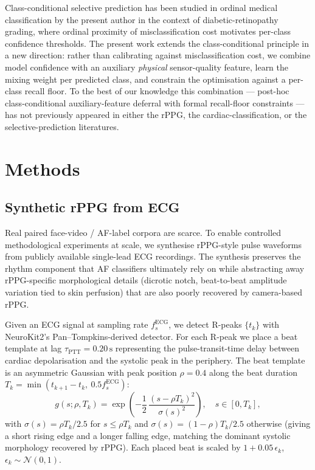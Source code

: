 \documentclass[journal]{IEEEtran}
\begin{document}
Class-conditional selective prediction has been studied in ordinal medical classification by the present author in the context of diabetic-retinopathy grading, where ordinal proximity of misclassification cost motivates per-class confidence thresholds. The present work extends the class-conditional principle in a new direction: rather than calibrating against misclassification cost, we combine model confidence with an auxiliary \emph{physical} sensor-quality feature, learn the mixing weight per predicted class, and constrain the optimisation against a per-class recall floor. To the best of our knowledge this combination --- post-hoc class-conditional auxiliary-feature deferral with formal recall-floor constraints --- has not previously appeared in either the rPPG, the cardiac-classification, or the selective-prediction literatures.

\section{Methods}
\subsection{Synthetic rPPG from ECG}
Real paired face-video / AF-label corpora are scarce. To enable controlled methodological experiments at scale, we synthesise rPPG-style pulse waveforms from publicly available single-lead ECG recordings. The synthesis preserves the rhythm component that AF classifiers ultimately rely on while abstracting away rPPG-specific morphological details (dicrotic notch, beat-to-beat amplitude variation tied to skin perfusion) that are also poorly recovered by camera-based rPPG.

Given an ECG signal at sampling rate $f_s^{\text{ECG}}$, we detect R-peaks $\{t_k\}$ with NeuroKit2's Pan--Tompkins-derived detector. For each R-peak we place a beat template at lag $\tau_{\text{PTT}} = 0.20\,\text{s}$ representing the pulse-transit-time delay between cardiac depolarisation and the systolic peak in the periphery. The beat template is an asymmetric Gaussian with peak position $\rho = 0.4$ along the beat duration $T_k = \min(t_{k+1} - t_k,\ 0.5 f_s^{\text{ECG}})$:
\begin{equation}
g(s; \rho, T_k) = \exp\!\left(-\frac{1}{2}\,\frac{(s - \rho T_k)^2}{\sigma(s)^2}\right),\quad s \in [0, T_k],
\end{equation}
with $\sigma(s) = \rho T_k / 2.5$ for $s \leq \rho T_k$ and $\sigma(s) = (1-\rho) T_k / 2.5$ otherwise (giving a short rising edge and a longer falling edge, matching the dominant systolic morphology recovered by rPPG). Each placed beat is scaled by $1 + 0.05\,\epsilon_k$, $\epsilon_k \sim \mathcal{N}(0,1)$.
\end{document}
